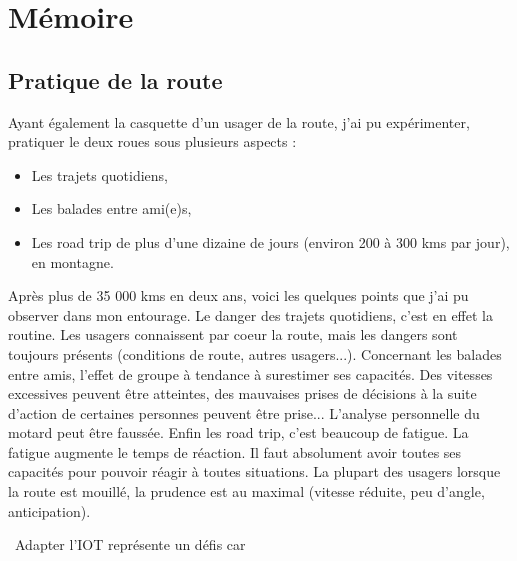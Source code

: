 \section{Mémoire}

\subsection{Pratique de la route}
Ayant également la casquette d'un usager de la route, j'ai pu expérimenter, pratiquer le deux roues sous plusieurs aspects : \
\begin{itemize}
    \item Les trajets quotidiens,
    \item Les balades entre ami(e)s,
    \item Les road trip de plus d'une dizaine de jours (environ 200 à 300 kms par jour), en montagne.
\end{itemize}

Après plus de 35 000 kms en deux ans, voici les quelques points que j'ai pu observer dans mon entourage.
Le danger des trajets quotidiens, c'est en effet la routine. Les usagers connaissent par coeur la route, mais les dangers sont toujours présents (conditions de route, autres usagers...).
Concernant les balades entre amis, l'effet de groupe à tendance à surestimer ses capacités. Des vitesses excessives peuvent être atteintes, des mauvaises prises de décisions à la suite d'action de certaines personnes peuvent être prise... L'analyse personnelle du motard peut être faussée.
Enfin les road trip, c'est beaucoup de fatigue. La fatigue augmente le temps de réaction. Il faut absolument avoir toutes ses capacités pour pouvoir réagir à toutes situations.
La plupart des usagers lorsque la route est mouillé, la prudence est au maximal (vitesse réduite, peu d'angle, anticipation).

\
Adapter l'IOT représente un défis car